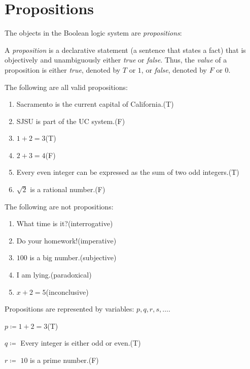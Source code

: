 \documentclass[letterpaper,12pt,fleqn]{article}
\begin{document}
\section*{Propositions}

The objects in the Boolean logic system are \emph{propositions}:

\begin{definition}[Proposition]
  A \emph{proposition} is a declarative statement (a sentence that states a fact) that is objectively and
  unambiguously either \emph{true} or \emph{false}.  Thus, the \emph{value} of a proposition is either \emph{true},
  denoted by \(T\) or \(1\), or \emph{false}, denoted by \(F\) or \(0\).
\end{definition}

\begin{examples}
  The following are all valid propositions:
  \begin{enumerate}
  \item Sacramento is the current capital of California.\quad(T)
  \item SJSU is part of the UC system.\quad(F)
  \item \(1+2=3\)\quad(T)
  \item \(2+3=4\)\quad(F)
  \item Every even integer can be expressed as the sum of two odd integers.\quad(T)
  \item \(\sqrt{2}\) is a rational number.\quad(F)
  \end{enumerate}

  The following are not propositions:
  \begin{enumerate}
  \item What time is it?\quad(interrogative)
  \item Do your homework!\quad(imperative)
  \item \(100\) is a big number.\quad(subjective)
  \item I am lying.\quad(paradoxical)
  \item \(x+2=5\)\quad(inconclusive)
  \end{enumerate}
\end{examples}

Propositions are represented by variables: \(p,q,r,s,\ldots\).

\begin{examples}
  \(p\coloneqq1+2=3\)\quad(T)

  \(q\coloneqq\) Every integer is either odd or even.\quad(T)

  \(r\coloneqq\) \(10\) is a prime number.\quad(F)
\end{examples}
\end{document}
